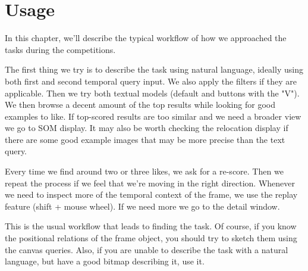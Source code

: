 \section{Usage}
\label{sec:usage}


In this chapter, we'll describe the typical workflow of how we approached the tasks during the competitions. 

The first thing we try is to describe the task using natural language, ideally using both first and second temporal query input. We also apply the filters if they are applicable. Then we try both textual models (default and buttons with the "V"). We then browse a decent amount of the top results while looking for good examples to like. If top-scored results are too similar and we need a broader view we go to SOM display. It may also be worth checking the relocation display if there are some good example images that may be more precise than the text query.

Every time we find around two or three likes, we ask for a re-score. Then we repeat the process if we feel that we're moving in the right direction.
Whenever we need to inspect more of the temporal context of the frame, we use the replay feature (shift + mouse wheel). If we need more we go to the detail window.

This is the usual workflow that leads to finding the task. Of course, if you know the positional relations of the frame object, you should try to sketch them using the canvas queries. Also, if you are unable to describe the task with a natural language, but have a good bitmap describing it, use it.
